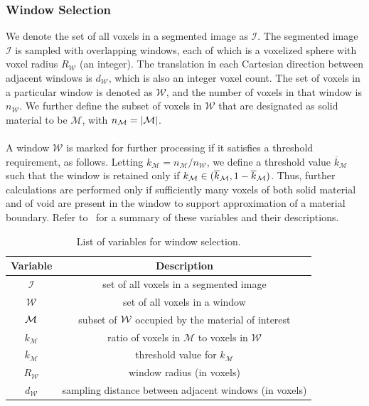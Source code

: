 \subsubsection{Window Selection}

We denote the set of all voxels in a segmented image as $\mathcal{I}$. The segmented image  $\mathcal{I}$ is sampled with overlapping windows, each of which is a voxelized sphere with voxel radius $R_{\mathcal{W}}$ (an integer). The translation in each Cartesian direction between adjacent windows is $d_{\mathcal{W}}$, which is also an integer voxel count. The set of voxels in a particular window is denoted as $\mathcal{W}$, and the number of voxels in that window is $n_{\mathcal{W}}$. We further define the subset of voxels in $\mathcal{W}$ that are designated as solid material to be $\mathcal{M}$, with $n_{\mathcal{M}} = | \mathcal{M} |$. \\ \\
%
A window $\mathcal{W}$ is marked for further processing if it satisfies a threshold requirement, as follows.  Letting $k_{\mathcal{M}} = n_{\mathcal{M}}/n_{\mathcal{W}}$, we define a threshold value $\overline{k}_{\mathcal{M}}$ such that the window is retained only if $k_{\mathcal{M}} \in (\overline{k}_{\mathcal{M}}, 1 - \overline{k}_{\mathcal{M}})$.  Thus, further calculations are performed only if sufficiently many voxels of both solid material and of void are present in the window to support approximation of a material boundary. Refer to~ for a summary of these variables and their descriptions. \\

\begin{table}[htbp!]
 \centering
   \begin{tabular}{|c||c|}
   \hline
   {\textbf{Variable}} & \textbf{Description} \\ \hline \hline
   $\mathcal{I}$ & set of all voxels in a segmented image \\ \hline
   $\mathcal{W}$ & set of all voxels in a window \\ \hline
   $\mathcal{M}$ & subset of $\mathcal{W}$ occupied by the material of interest\\ \hline
   {$k_{\mathcal{M}}$} & ratio of voxels in $\mathcal{M}$ to voxels in $\mathcal{W}$\\ \hline
   {$\overline{k}_{\mathcal{M}}$ \rule{0mm}{4mm}} & threshold value for $k_{\mathcal{M}}$ \\ \hline 
   $R_{\mathcal{W}}$ & window radius (in voxels) \\ \hline
   $d_{\mathcal{W}}$ & sampling distance between adjacent windows (in voxels) \\ \hline  
\end{tabular}
\caption{List of variables for window selection.}
\label{tab:window}
\end{table}

